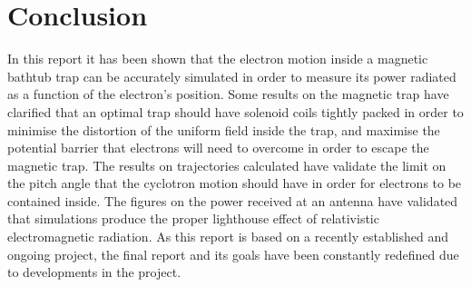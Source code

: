 \documentclass[a4paper,12pt, notitlepage]{article}
\begin{document}
\section{Conclusion}
In this report it has been shown that the electron motion inside a magnetic bathtub trap can be accurately simulated in order to measure its power radiated as a function of the electron's position. Some results on the magnetic trap have clarified that an optimal trap should have solenoid coils tightly packed in order to minimise the distortion of the uniform field inside the trap, and maximise the potential barrier that electrons will need to overcome in order to escape the magnetic trap. The results on trajectories calculated have validate the limit on the pitch angle that the cyclotron motion should have in order for electrons to be contained inside.
The figures on the power received at an antenna have validated that simulations produce the proper lighthouse effect of relativistic electromagnetic radiation. As this report is based on a recently established and ongoing project, the final report and its goals have been constantly redefined due to developments in the project. %
\end{document}
